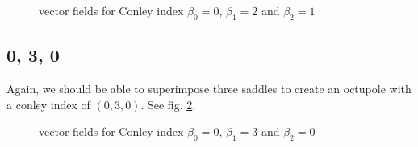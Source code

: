 \documentclass[a4paper,10pt,notitlepage]{scrartcl}
\begin{document}
\begin{figure}
  \centering
  \caption{vector fields for Conley index $\beta_0 = 0$, $\beta_1 = 2$ and
$\beta_2 = 1$}
  \label{fig:conley-021}
\end{figure}

\subsection*{0, 3, 0}

Again, we should be able to superimpose three saddles to create an octupole
with a conley index of $(0, 3, 0)$. See fig. \ref{fig:conley-030}.

\begin{figure}
  \centering
  \caption{vector fields for Conley index $\beta_0 = 0$, $\beta_1 = 3$ and
$\beta_2 = 0$}
  \label{fig:conley-030}
\end{figure}
\end{document}
